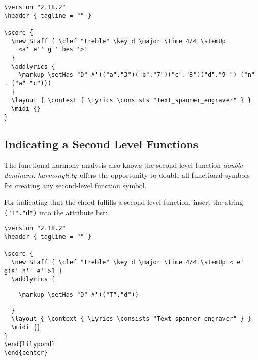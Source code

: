 \documentclass[
  DIV=calc,
  BCOR=5mm,
  12pt,
  headings=small,
  oneside,
  abstract=true,
  toc=bib,
  xcolor=dvipsnames,
  openany,
  ngerman,english]{scrartcl}
\newcommand{\acc}[0]{\textit}
\newcommand{\hlyn}[0]{\textit{harmonyli.ly}}
\begin{document}
\begin{scriptsize}
\begin{verbatim}
\version "2.18.2"
\header { tagline = "" }

\score {
  \new Staff { \clef "treble" \key d \major \time 4/4 \stemUp 
    <a' e'' g'' bes''>1 
  }
  \addlyrics { 
    \markup \setHas "D" #'(("a"."3")("b"."7")("c"."8")("d"."9-") ("n" . ("a" "c"))) 
  }
  \layout { \context { \Lyrics \consists "Text_spanner_engraver" } }
  \midi {}
}
\end{verbatim}
\end{scriptsize}

\subsection{Indicating a Second Level Functions}

The functional harmony analysis also knows the second-level function \acc{double
dominant}. \hlyn\ offers the opportunity to double all functional symbols for
creating any second-level function symbol.

For indicating that the chord fulfills a second-level function, insert the string
\texttt{("T"."d")} into the attribute list:

\begin{center}
\end{center}

\begin{scriptsize}
\begin{verbatim}
\version "2.18.2"
\header { tagline = "" }

\score {
  \new Staff { \clef "treble" \key d \major \time 4/4 \stemUp < e' gis' h'' e''>1 }
  \addlyrics { 
\end{verbatim}
{ \color{red} \verb|    \markup \setHas "D" #'(("T"."d"))| }
\begin{verbatim}    
  }
  \layout { \context { \Lyrics \consists "Text_spanner_engraver" } }
  \midi {}
}
\end{lilypond}
\end{center}
\end{verbatim}
\end{scriptsize}
\end{document}
